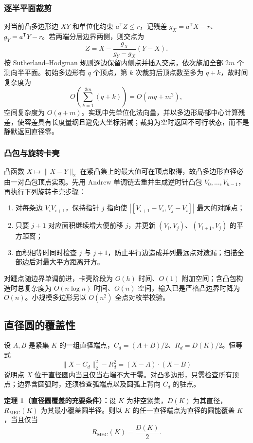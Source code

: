 \subsubsection{逐半平面裁剪}
对当前凸多边形边 $XY$ 和单位化约束 $a^{\mathsf T}Z\le r$，记残差 $g_X=a^{\mathsf T}X-r$、$g_Y=a^{\mathsf T}Y-r$。若两端分居边界两侧，则交点为
\[
Z=X-\frac{g_X}{g_Y-g_X}(Y-X).
\]
按 Sutherland--Hodgman 规则逐边保留内侧点并插入交点，依次施加全部 $2m$ 个测向半平面\cite{sutherland1974}。初始多边形有 $q$ 个顶点，第 $k$ 次裁剪后顶点数至多为 $q+k$，故时间复杂度为
\[
O\!\left(\sum_{k=1}^{2m}(q+k)\right)=O(mq+m^2),
\]
空间复杂度为 $O(q+m)$。实现中先单位化法向量，并以多边形局部中心计算残差，使容差具有长度量纲且避免大坐标消减；裁剪为空时返回不可行状态，而不是静默返回直径零。

\subsubsection{凸包与旋转卡壳}
凸函数 $X\mapsto\lVert X-Y\rVert_2$ 在紧凸集上的最大值可在顶点取得，故凸多边形直径必由一对凸包顶点实现。先用 Andrew 单调链去重并生成逆时针凸包 $V_0,\ldots,V_{h-1}$，再执行下列旋转卡壳步骤\cite{toussaint2014}：
\begin{enumerate}
  \item 对每条边 $V_iV_{i+1}$，保持指针 $j$ 指向使 $|[V_{i+1}-V_i,V_j-V_i]|$ 最大的对踵点；
  \item 只要 $j+1$ 对应面积继续增大便前移 $j$，并更新 $(V_i,V_j)$、$(V_{i+1},V_j)$ 的平方距离；
  \item 面积相等时同时检查 $j$ 与 $j+1$，防止平行边造成并列最远点对遗漏；扫描全部边后对最大平方距离开方。
\end{enumerate}
对踵点随边界单调前进，卡壳阶段为 $O(h)$ 时间、$O(1)$ 附加空间；含凸包构造时总复杂度为 $O(n\log n)$ 时间、$O(n)$ 空间，输入已是严格凸边界时降为 $O(n)$。小规模多边形另以 $O(n^2)$ 全点对枚举校验。

\subsection{直径圆的覆盖性}
设 $A,B$ 是紧集 $K$ 的一组直径端点，$C_d=(A+B)/2$、$R_d=D(K)/2$。恒等式
\[
\lVert X-C_d\rVert_2^2-R_d^2=(X-A)\cdot(X-B)
\]
说明点 $X$ 位于直径圆内当且仅当右端不大于零。对凸多边形，只需检查所有顶点；边界含圆弧时，还须检查弧端点以及圆弧上背向 $C_d$ 的驻点。

\textbf{定理 1（直径圆覆盖的充要条件）：}设 $K$ 为非空紧集，$D(K)$ 为其直径，$R_{\mathrm{MEC}}(K)$ 为其最小覆盖圆半径。则以 $K$ 的任一直径端点为直径的圆能覆盖 $K$，当且仅当
\[
R_{\mathrm{MEC}}(K)=\frac{D(K)}2.
\]

